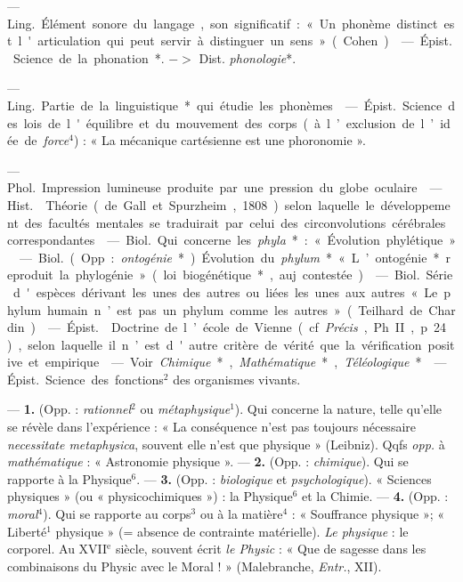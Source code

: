 \begin{itemize}[leftmargin=1cm, label=, itemsep=1pt]
 — \si{Ling.} Élément sonore du langage, son significatif : « Un
phonème distinct est l'articulation qui peut servir à distinguer un sens
» (Cohen).

 — \si{Épist.} Science de la
phonation*. $->$ Dist. {\it phonologie}*.

 — \si{Ling.} Partie de la linguistique* qui étudie les
phonèmes.

 — \si{Épist.} Science des lois de l'équilibre et du mouvement
des corps (à l’exclusion de l’idée de {\it force}$^4$) : « La mécanique
cartésienne est une phoronomie ».

 — \si{Phol.} Impression lumineuse produite par une pression du
globe oculaire.

 — \si{Hist.}  Théorie (de Gall et Spurzheim,
1808) selon laquelle le développement des facultés mentales se traduirait par
celui des circonvolutions cérébrales correspondantes.

 — \si{Biol.} Qui concerne les
{\it phyla}* : « Évolution phylétique ».

 — \si{Biol.} (Opp. : {\it ontogénie}*). Évolution du
{\it phylum}* « L’ontogénie* reproduit la phylogénie » (loi biogénétique*,
auj. contestée).

 — \si{Biol.} Série d'espèces dérivant les unes des autres ou
liées les unes aux autres « Le phylum humain n’est pas un phylum comme les
autres » (Teilhard de Chardin).

 — \si{Épist.}  Doctrine de l’école de Vienne
(cf. {\it Précis}, Ph. II, p. 24), selon laquelle il n’est d'autre critère de
vérité que la vérification positive et empirique.

 — Voir {\it Chimique}*, {\it Mathématique}*,
{\it Téléologique}*.

 — \si{Épist.} Science des
fonctions$^2$ des organismes vivants.

 — {\bf 1.} (Opp. : {\it rationnel}$^2$ ou {\it
métaphysique}$^1$). Qui concerne la nature, telle qu’elle se révèle dans
l'expérience : « La conséquence n’est pas toujours nécessaire {\it
necessitate metaphysica}, souvent elle n’est que physique » (Leibniz). Qqfs
{\it opp.} à {\it mathématique} : « Astronomie physique ». — {\bf 2.} (Opp. :
{\it chimique}). Qui se rapporte à la Physique$^6$. — {\bf 3.} (Opp. : {\it
biologique} et {\it psychologique}). « Sciences physiques » (ou «
physicochimiques ») : la Physique$^6$ et la Chimie. — {\bf 4.} (Opp. : {\it
moral}$^4$). Qui se rapporte au corps$^3$ ou à la matière$^4$ : « Souffrance
physique »; « Liberté$^1$ physique » (= absence de contrainte matérielle).
{\it Le physique} : le corporel. Au {\footnotesize XVII}$^\text{e}$ siècle,
souvent écrit {\it le Physic} : « Que de sagesse dans les combinaisons du
 Physic avec le Moral ! » (Malebranche, {\it Entr.}, XII).


\end{itemize}
